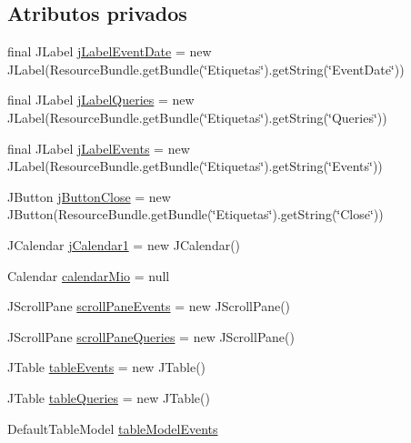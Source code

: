 \subsection*{Atributos privados}
\begin{DoxyCompactItemize}
\item 
final J\+Label \mbox{\hyperlink{classgui_1_1ApuestaGUI_a0fd9f96ea739167f2e8e801a269e66e0}{j\+Label\+Event\+Date}} = new J\+Label(Resource\+Bundle.\+get\+Bundle(\char`\"{}Etiquetas\char`\"{}).get\+String(\char`\"{}Event\+Date\char`\"{}))
\item 
final J\+Label \mbox{\hyperlink{classgui_1_1ApuestaGUI_af3501bb228b690c3838ab6c6be176920}{j\+Label\+Queries}} = new J\+Label(Resource\+Bundle.\+get\+Bundle(\char`\"{}Etiquetas\char`\"{}).get\+String(\char`\"{}Queries\char`\"{}))
\item 
final J\+Label \mbox{\hyperlink{classgui_1_1ApuestaGUI_a6743a3e782efb0cd456e2cb92e221d8c}{j\+Label\+Events}} = new J\+Label(Resource\+Bundle.\+get\+Bundle(\char`\"{}Etiquetas\char`\"{}).get\+String(\char`\"{}Events\char`\"{}))
\item 
J\+Button \mbox{\hyperlink{classgui_1_1ApuestaGUI_abcd9daa679259596d9d75045bd184245}{j\+Button\+Close}} = new J\+Button(Resource\+Bundle.\+get\+Bundle(\char`\"{}Etiquetas\char`\"{}).get\+String(\char`\"{}Close\char`\"{}))
\item 
J\+Calendar \mbox{\hyperlink{classgui_1_1ApuestaGUI_a8e68888312d4d5b98e78519783792a09}{j\+Calendar1}} = new J\+Calendar()
\item 
Calendar \mbox{\hyperlink{classgui_1_1ApuestaGUI_af6cd8443e364b2ae32ecbb39e2aece05}{calendar\+Mio}} = null
\item 
J\+Scroll\+Pane \mbox{\hyperlink{classgui_1_1ApuestaGUI_aeaccc6b748bdd9a346f7e0b3274c4aad}{scroll\+Pane\+Events}} = new J\+Scroll\+Pane()
\item 
J\+Scroll\+Pane \mbox{\hyperlink{classgui_1_1ApuestaGUI_a9fe3c26976c3e329c5cdaafe55cfc6d9}{scroll\+Pane\+Queries}} = new J\+Scroll\+Pane()
\item 
J\+Table \mbox{\hyperlink{classgui_1_1ApuestaGUI_ad1013620386b69c40a3de1b026eaeda1}{table\+Events}} = new J\+Table()
\item 
J\+Table \mbox{\hyperlink{classgui_1_1ApuestaGUI_a5289b9952a5f334001b12e1ef4b1a6b0}{table\+Queries}} = new J\+Table()
\item 
Default\+Table\+Model \mbox{\hyperlink{classgui_1_1ApuestaGUI_a97a1e997e9b5188b4afa3f26a1a92847}{table\+Model\+Events}}
\item 

\end{DoxyCompactItemize}

